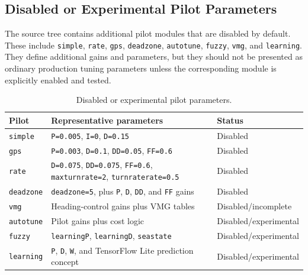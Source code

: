 \documentclass[11pt,twocolumn]{article}
\begin{document}
\subsection{Disabled or Experimental Pilot Parameters}
The source tree contains additional pilot modules that are disabled by
default.  These include \texttt{simple}, \texttt{rate}, \texttt{gps},
\texttt{deadzone}, \texttt{autotune}, \texttt{fuzzy}, \texttt{vmg}, and
\texttt{learning}.  They define additional gains and parameters, but they
should not be presented as ordinary production tuning parameters unless
the corresponding module is explicitly enabled and tested.
\begin{table}[t]
\centering
\caption{Disabled or experimental pilot parameters.}
\label{tab:pypilot-disabled-pilots}
\begin{tabularx}{\textwidth}{Z{0.16\textwidth}YZ{0.16\textwidth}}
\toprule
Pilot & Representative parameters & Status \\
\midrule
\texttt{simple} &
\texttt{P=0.005}, \texttt{I=0}, \texttt{D=0.15} &
Disabled \\
\texttt{gps} &
\texttt{P=0.003}, \texttt{D=0.1}, \texttt{DD=0.05}, \texttt{FF=0.6} &
Disabled \\
\texttt{rate} &
\texttt{D=0.075}, \texttt{DD=0.075}, \texttt{FF=0.6},
\texttt{maxturnrate=2}, \texttt{turnraterate=0.5} &
Disabled \\
\texttt{deadzone} &
\texttt{deadzone=5}, plus \texttt{P}, \texttt{D}, \texttt{DD}, and
\texttt{FF} gains &
Disabled \\
\texttt{vmg} &
Heading-control gains plus VMG tables &
Disabled/incomplete \\
\texttt{autotune} &
Pilot gains plus cost logic &
Disabled/experimental \\
\texttt{fuzzy} &
\texttt{learningP}, \texttt{learningD}, \texttt{seastate} &
Disabled/experimental \\
\texttt{learning} &
\texttt{P}, \texttt{D}, \texttt{W}, and TensorFlow Lite prediction concept &
Disabled/experimental \\
\bottomrule
\end{tabularx}
\end{table}
\end{document}

